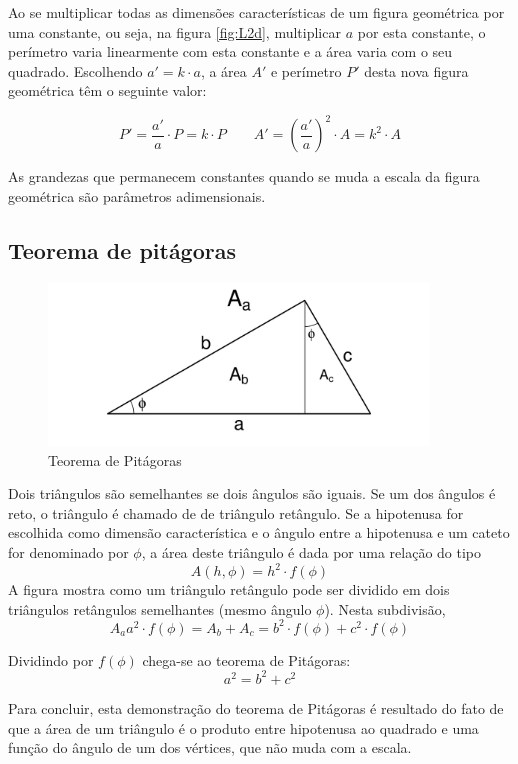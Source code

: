 \documentclass[article,12pt,oneside,a4paper,english,brazil,sumario=tradicional]{abntex2}
\begin{document}
Ao se multiplicar todas as dimensões características de um figura geométrica por uma constante, ou seja, na figura \ref{fig:L2d}, multiplicar $a$ por esta constante, o perímetro varia linearmente com esta constante e a área varia com o seu quadrado. Escolhendo $a'=k\cdot a$, a área $A'$ e perímetro $P'$ desta nova figura geométrica têm o seguinte valor:

\[
P' = \frac{a'}{a}\cdot P = k\cdot P \qquad A' = \left(\frac{a'}{a}\right)^2\cdot A = k^2\cdot A
\]

As grandezas que permanecem constantes quando se muda a escala da figura geométrica são parâmetros adimensionais.

\subsection{Teorema de pitágoras}

\begin{figure}
  \centering
  \includegraphics[width=0.9\textwidth]{./figuras/pitagoras}
  \caption{Teorema de Pitágoras}
  \label{fig:pit}
\end{figure}

Dois triângulos são semelhantes se dois ângulos são iguais. Se um dos ângulos é reto, o triângulo é chamado de de triângulo retângulo. Se a hipotenusa for escolhida como dimensão característica e o ângulo entre a hipotenusa e um cateto for denominado por $\phi$, a área deste triângulo é dada por uma relação do tipo
\[
A(h,\phi) = h^2\cdot f(\phi)
\]
A figura mostra como um triângulo retângulo pode ser dividido em dois triângulos retângulos semelhantes (mesmo ângulo $\phi$). Nesta subdivisão, 
\[
A_a a^2\cdot f(\phi) = A_b + A_c = b^2\cdot f(\phi) + c^2\cdot f(\phi)
\]

Dividindo por $f(\phi)$ chega-se ao teorema de Pitágoras:
\[
a^2 = b^2 + c^2
\]

Para concluir, esta demonstração do teorema de Pitágoras é resultado do fato de que a área de um triângulo é o produto entre hipotenusa ao quadrado e uma função do ângulo de um dos vértices, que não muda com a escala.
\end{document}
